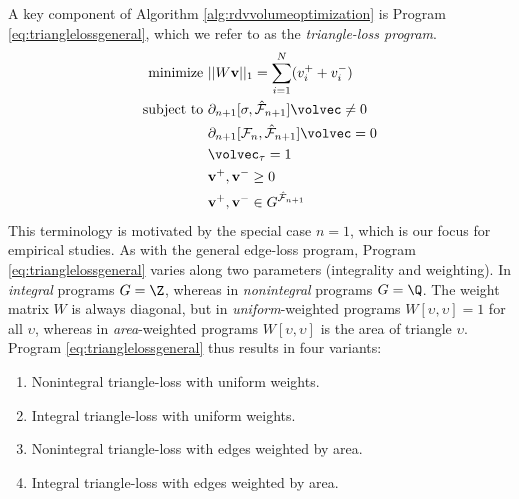 A key component of Algorithm \ref{alg:rdvvolumeoptimization} is Program \eqref{eq:trianglelossgeneral}, which we refer to as the \emph{triangle-loss program}.
\begin{align}
\begin{split}
 \text{minimize } & ||W \mathbf{v} ||_1 = \sum_{i=1}^N (v_i^+ + v_i^-)  \\
\text{subject to } &  \partial_{n+1}[ \sigma , \hat {\mathcal{F}}_{n+1} ] \volvec \neq 0     \\
&  \partial_{n+1}[\mathcal{F}_n, \hat {\mathcal{F}}_{n+1} ] \volvec = 0 \\
 & \volvec_{\tau} = 1\\
     & \mathbf{v}^+, \mathbf{v}^- \ge 0 \\
& \mathbf{v}^+, \mathbf{v}^- \in G^{ \hat {\mathcal{F}}_{n+1}}
\end{split}
\label{eq:trianglelossgeneral}
\end{align} 
This terminology is motivated by the special case $n=1$, which is our focus for  empirical studies.  As with the general edge-loss program, Program \eqref{eq:trianglelossgeneral} varies along two  parameters (integrality and weighting).  In \emph{integral} programs $G = \Z$, whereas in \emph{nonintegral} programs $G = \Q$.  The weight matrix $W$ is always diagonal, but in \emph{uniform}-weighted programs $W[\upsilon, \upsilon] = 1$ for all $\upsilon$, whereas in \emph{area}-weighted programs $W[\upsilon, \upsilon]$ is the area
 of triangle $\upsilon$.  Program \eqref{eq:trianglelossgeneral} thus results in four variants:
 
 
\begin{enumerate}[style=multiline]
    \item[\namedlabel{itm:tri_NIU}{$\Tri\NI\unif$}] Nonintegral triangle-loss with uniform weights.
    \item[\namedlabel{itm:tri_IU}{$\Tri\I\unif$}] Integral triangle-loss with uniform weights.
    \item[\namedlabel{itm:tri_NIA}{$\Tri\NI\area$}] Nonintegral triangle-loss with edges weighted by area. 
    \item[\namedlabel{itm:tri_IA}{$\Tri\I\area$}] Integral triangle-loss with edges weighted by area. 
\end{enumerate}

